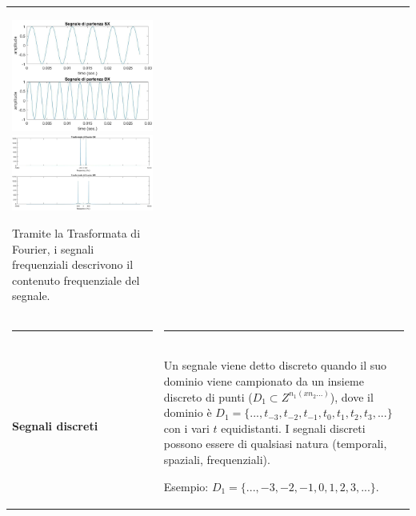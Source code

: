 \documentclass[a4paper, 10pt]{report}
\begin{document}
\begin{longtable}{| p{} | p{} |}
\begin{center}
\includegraphics[scale=0.4]{34_cropped.pdf}
\includegraphics[scale=0.4]{35_cropped.pdf}
\end{center}

\noindent Tramite la Trasformata di Fourier, i segnali frequenziali descrivono il contenuto frequenziale del segnale.
\\
\hrule & \hrule
\\
\textbf{Segnali discreti} & Un segnale viene detto discreto quando il suo dominio viene campionato da un insieme discreto di punti ($D_1 \subset Z^{n_1(x n_2 ...)}$), dove il dominio è $D_1 = \{..., t_{-3}, t_{-2}, t_{-1}, t_0, t_1, t_2, t_3, ...\}$ con i vari $t$ equidistanti. I segnali discreti possono essere di qualsiasi natura (temporali, spaziali, frequenziali).

Esempio: $D_1 = \{..., -3, -2, -1, 0, 1, 2, 3, ...\}$. 


\end{longtable}
\end{document}
